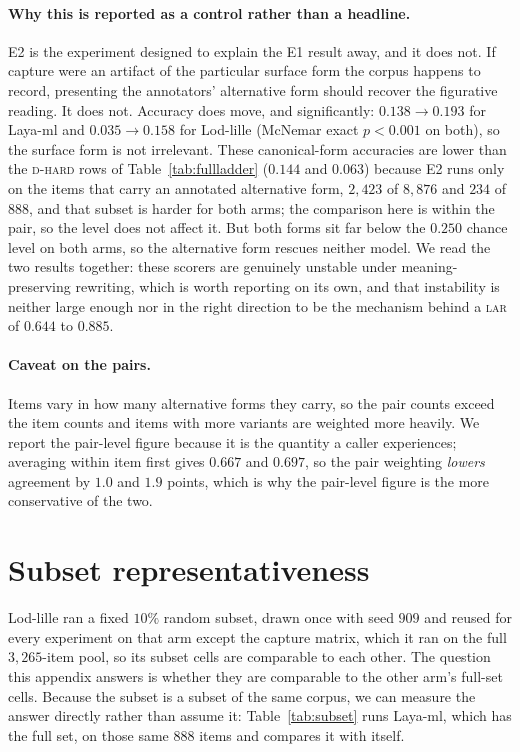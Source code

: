 \documentclass[11pt]{article}
\newcommand{\Dhard}{\textsc{d-hard}}
\newcommand{\LAR}{\textsc{lar}}
\begin{document}
\paragraph{Why this is reported as a control rather than a headline.} E2 is the
experiment designed to explain the E1 result away, and it does not. If capture were
an artifact of the particular surface form the corpus happens to record, presenting
the annotators' alternative form should recover the figurative reading. It does not.
Accuracy does move, and significantly: $0.138 \rightarrow 0.193$ for Laya-ml and
$0.035 \rightarrow 0.158$ for Lod-lille (McNemar exact $p < 0.001$ on both), so the
surface form is not irrelevant. These canonical-form accuracies are lower than the
\Dhard{} rows of Table~\ref{tab:fullladder} ($0.144$ and $0.063$) because E2 runs
only on the items that carry an annotated alternative form, $2{,}423$ of $8{,}876$
and $234$ of $888$, and that subset is harder for both arms; the comparison here is
within the pair, so the level does not affect it. But both forms sit far below the $0.250$ chance
level on both arms, so the alternative form rescues neither model. We read the two
results together: these scorers are genuinely unstable under meaning-preserving
rewriting, which is worth reporting on its own, and that instability is neither
large enough nor in the right direction to be the mechanism behind a \LAR{} of
$0.644$ to $0.885$.

\paragraph{Caveat on the pairs.} Items vary in how many alternative forms they
carry, so the pair counts exceed the item counts and items with more variants are
weighted more heavily. We report the pair-level figure because it is the
quantity a caller experiences; averaging within item first gives $0.667$ and
$0.697$, so the pair weighting \emph{lowers} agreement by $1.0$ and $1.9$ points,
which is why the pair-level figure is the more conservative of the two.

\section{Subset representativeness}
\label{app:subset}

Lod-lille ran a fixed $10\%$ random subset, drawn once with seed $909$ and reused
for every experiment on that arm except the capture matrix, which it ran on the
full $3{,}265$-item pool, so its subset cells are comparable to each other.
The question this appendix answers is whether they are comparable to the other
arm's full-set cells. Because the subset is a subset of the same corpus, we can
measure the answer directly rather than assume it: Table~\ref{tab:subset} runs
Laya-ml, which has the full set, on those same $888$ items and compares it with
itself.
\end{document}
